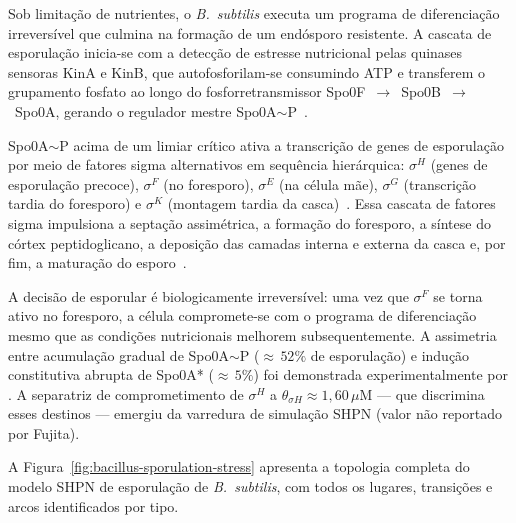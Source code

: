 Sob limitação de nutrientes, o \textit{B.~subtilis} executa um programa de
diferenciação irreversível que culmina na formação de um endósporo resistente.
A cascata de esporulação inicia-se com a detecção de estresse nutricional pelas
quinases sensoras KinA e KinB, que autofosforilam-se consumindo ATP e
transferem o grupamento fosfato ao longo do fosforretransmissor
Spo0F~$\to$~Spo0B~$\to$~Spo0A, gerando o regulador mestre
Spo0A${\sim}$P~\cite{Burbulys1991,Fujita2005}.

Spo0A${\sim}$P acima de um limiar crítico ativa a transcrição de genes de
esporulação por meio de fatores sigma alternativos em sequência
hierárquica: $\sigma^H$ (genes de esporulação precoce),
$\sigma^F$ (no foresporo), $\sigma^E$ (na célula mãe), $\sigma^G$
(transcrição tardia do foresporo) e $\sigma^K$ (montagem tardia da casca)~\cite{Stragier1996,Errington2003}.
Essa cascata de fatores sigma impulsiona a septação assimétrica, a
formação do foresporo, a síntese do córtex peptidoglicano, a deposição das
camadas interna e externa da casca e, por fim, a maturação do esporo~\cite{Errington2003}.

A decisão de esporular é biologicamente irreversível: uma vez que
$\sigma^F$ se torna ativo no foresporo, a célula compromete-se com o programa
de diferenciação mesmo que as condições nutricionais melhorem
subsequentemente.
A assimetria entre acumulação gradual de Spo0A${\sim}$P
(${\approx}\,52\%$ de esporulação) e indução constitutiva abrupta de Spo0A*
(${\approx}\,5\%$) foi demonstrada experimentalmente por \textcite{Fujita2005}.
A separatriz de comprometimento de $\sigma^H$ a
$\theta_{\sigma H} \approx 1{,}60\,\mu$M --- que discrimina esses destinos ---
emergiu da varredura de simulação SHPN (valor não reportado por Fujita).

A Figura~\ref{fig:bacillus-sporulation-stress} apresenta a topologia completa
do modelo SHPN de esporulação de \textit{B.~subtilis}, com todos os lugares,
transições e arcos identificados por tipo.

